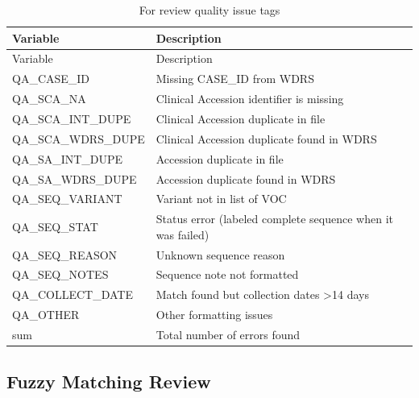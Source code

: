 \documentclass[
]{agujournal2019}
\begin{document}
\begin{longtable}[]{@{}
  >{\raggedright\arraybackslash}p{}
  >{\raggedright\arraybackslash}p{}@{}}
\caption{For review quality issue tags}\label{tbl-review}\tabularnewline
\toprule\noalign{}
\begin{minipage}[b]{\linewidth}\raggedright
Variable
\end{minipage} & \begin{minipage}[b]{\linewidth}\raggedright
Description
\end{minipage} \\
\midrule\noalign{}
\endfirsthead
\toprule\noalign{}
\begin{minipage}[b]{\linewidth}\raggedright
Variable
\end{minipage} & \begin{minipage}[b]{\linewidth}\raggedright
Description
\end{minipage} \\
\midrule\noalign{}
\endhead
\bottomrule\noalign{}
\endlastfoot
QA\_CASE\_ID & Missing CASE\_ID from WDRS \\
QA\_SCA\_NA & Clinical Accession identifier is missing \\
QA\_SCA\_INT\_DUPE & Clinical Accession duplicate in file \\
QA\_SCA\_WDRS\_DUPE & Clinical Accession duplicate found in WDRS \\
QA\_SA\_INT\_DUPE & Accession duplicate in file \\
QA\_SA\_WDRS\_DUPE & Accession duplicate found in WDRS \\
QA\_SEQ\_VARIANT & Variant not in list of VOC \\
QA\_SEQ\_STAT & Status error (labeled complete sequence when it was
failed) \\
QA\_SEQ\_REASON & Unknown sequence reason \\
QA\_SEQ\_NOTES & Sequence note not formatted \\
QA\_COLLECT\_DATE & Match found but collection dates \textgreater14
days \\
QA\_OTHER & Other formatting issues \\
sum & Total number of errors found \\
\end{longtable}

\subsection{Fuzzy Matching Review}\label{fuzzy-matching-review}
\end{document}
